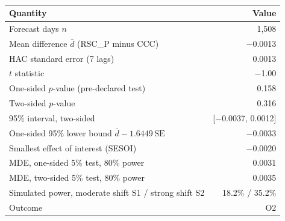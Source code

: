 \begin{table}[t]
\centering{}\footnotesize\setlength{\tabcolsep}{5pt}
\caption{}\label{tab:holdout-primary}
\begin{tabular}{lr}
\toprule
Quantity & Value \\
\midrule
Forecast days $n$ & 1,508 \\
Mean difference $\bar d$ (RSC\_P minus CCC) & $-$0.0013 \\
HAC standard error (7 lags) & 0.0013 \\
$t$ statistic & $-$1.00 \\
One-sided $p$-value (pre-declared test) & 0.158 \\
Two-sided $p$-value & 0.316 \\
95\% interval, two-sided & [$-$0.0037, 0.0012] \\
One-sided 95\% lower bound $\bar d-1.6449\,\mathrm{SE}$ & $-$0.0033 \\
Smallest effect of interest (SESOI) & $-$0.0020 \\
MDE, one-sided 5\% test, 80\% power & 0.0031 \\
MDE, two-sided 5\% test, 80\% power & 0.0035 \\
Simulated power, moderate shift S1 / strong shift S2 & 18.2\% / 35.2\% \\
Outcome & O2 \\
\bottomrule
\end{tabular}
\end{table}
